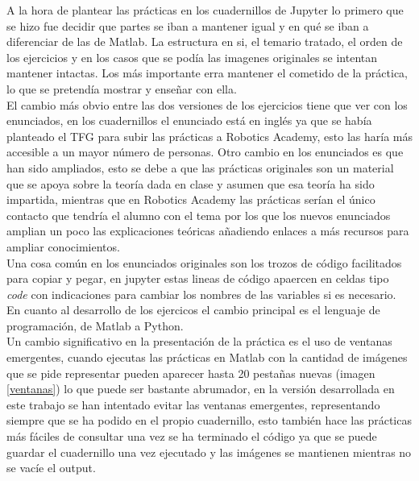 \documentclass[a4paper,12pt]{report}
\begin{document}
A la hora de plantear las prácticas en los cuadernillos de Jupyter lo primero que se hizo fue decidir que partes se iban a mantener igual y en qué se iban a diferenciar de las de Matlab. La estructura en si, el temario tratado, el orden de los ejercicios y en los casos que se podía las imagenes originales se intentan mantener intactas. Los más importante erra mantener el cometido de la práctica, lo que se pretendía mostrar y enseñar con ella.\\

El cambio más obvio entre las dos versiones de los ejercicios tiene que ver con los enunciados, en los cuadernillos el enunciado está en inglés ya que se había planteado el TFG para subir las prácticas a Robotics Academy, esto las haría más accesible a un mayor número de personas. Otro cambio en los enunciados es que han sido ampliados, esto se debe a que las prácticas originales son un material que se apoya sobre la teoría dada en clase y asumen que esa teoría ha sido impartida, mientras que en Robotics Academy las prácticas serían el único contacto que tendría el alumno con el tema por los que los nuevos enunciados amplian un poco las explicaciones teóricas añadiendo enlaces a más recursos para ampliar conocimientos.\\

Una cosa común en los enunciados originales son los trozos de código facilitados para copiar y pegar, en jupyter estas lineas de código apaercen en celdas tipo \emph{code} con indicaciones para cambiar los nombres de las variables si es necesario.\\

En cuanto al desarrollo de los ejercicos el cambio principal es el lenguaje de programación, de Matlab a Python. \\

Un cambio significativo en la presentación de la práctica es el uso de ventanas emergentes, cuando ejecutas las prácticas en Matlab con la cantidad de imágenes que se pide representar pueden aparecer hasta 20 pestañas nuevas  (imagen \ref{ventanas}) lo que puede ser bastante abrumador, en la versión desarrollada en este trabajo se han intentado evitar las ventanas emergentes, representando siempre que se ha podido en el propio cuadernillo, esto también hace las prácticas más fáciles de consultar una vez se ha terminado el código ya que se puede guardar el cuadernillo una vez ejecutado y las imágenes se mantienen mientras no se vacíe el output.\\
\end{document}
